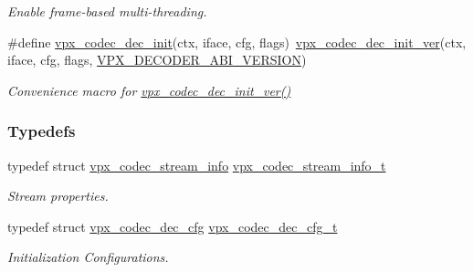 \begin{DoxyCompactItemize}
\begin{DoxyCompactList}\small\item\em Enable frame-\/based multi-\/threading. \end{DoxyCompactList}\item 
\#define \hyperlink{group__decoder_ga8c2f0b12f1bd4927eb3c68b01eab19d3}{vpx\+\_\+codec\+\_\+dec\+\_\+init}(ctx,  iface,  cfg,  flags)~\hyperlink{group__decoder_ga6435c3e8cb9408f1c0c3d052a3a577b7}{vpx\+\_\+codec\+\_\+dec\+\_\+init\+\_\+ver}(ctx, iface, cfg, flags, \hyperlink{group__decoder_ga462b459e7ae13937e1eae1776245db12}{V\+P\+X\+\_\+\+D\+E\+C\+O\+D\+E\+R\+\_\+\+A\+B\+I\+\_\+\+V\+E\+R\+S\+I\+ON})
\begin{DoxyCompactList}\small\item\em Convenience macro for \hyperlink{group__decoder_ga6435c3e8cb9408f1c0c3d052a3a577b7}{vpx\+\_\+codec\+\_\+dec\+\_\+init\+\_\+ver()} \end{DoxyCompactList}\end{DoxyCompactItemize}
\subsubsection*{Typedefs}
\begin{DoxyCompactItemize}
\item 
typedef struct \hyperlink{structvpx__codec__stream__info}{vpx\+\_\+codec\+\_\+stream\+\_\+info} \hyperlink{group__decoder_ga900420e8f7cb9c1b3070b2ba7d636974}{vpx\+\_\+codec\+\_\+stream\+\_\+info\+\_\+t}
\begin{DoxyCompactList}\small\item\em Stream properties. \end{DoxyCompactList}\item 
typedef struct \hyperlink{structvpx__codec__dec__cfg}{vpx\+\_\+codec\+\_\+dec\+\_\+cfg} \hyperlink{group__decoder_ga4a2e808eb43f1e798024b5a409c484f9}{vpx\+\_\+codec\+\_\+dec\+\_\+cfg\+\_\+t}
\begin{DoxyCompactList}\small\item\em Initialization Configurations. \end{DoxyCompactList}\end{DoxyCompactItemize}
